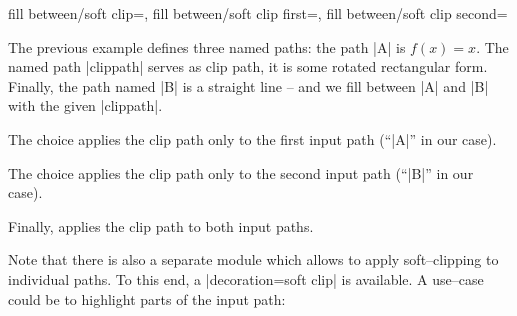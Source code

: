 \begin{tikzkeylist}{%
	fill between/soft clip=,%
	fill between/soft clip first=,%
	fill between/soft clip second=%
}
\begin{codeexample}[]
\end{codeexample}
	\noindent The previous example defines three named paths: the path |A| is $f(x) = x$. The named path |clippath| serves as clip path, it is some rotated rectangular form. Finally, the path named |B| is a straight line -- and we fill between |A| and |B| with the given |clippath|. 
	
	The choice  applies the clip path only to the first input path (``|A|'' in our case).

	The choice  applies the clip path only to the second input path (``|B|'' in our case).

	Finally,  applies the clip path to both input paths.
\begin{codeexample}[]
\end{codeexample}


	Note that there is also a separate module which allows to apply soft--clipping to individual paths. To this end, a |decoration=soft clip| is available. A use--case could be to highlight parts of the input path:
\begin{codeexample}[]
\end{codeexample}
\end{tikzkeylist}
